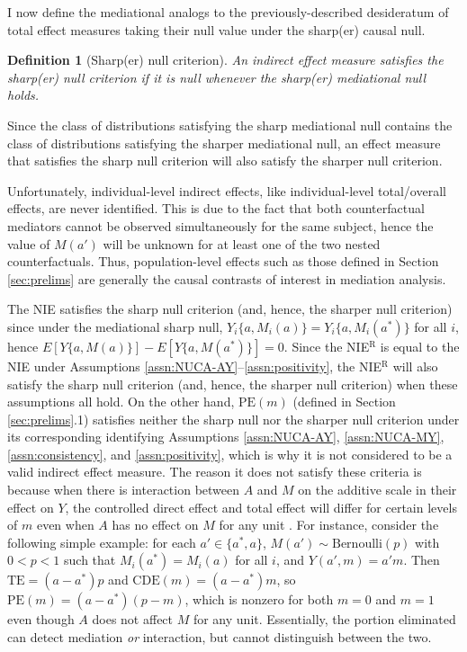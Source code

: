 \documentclass[12pt]{article}
\newtheorem{definition}{Definition}
\begin{document}

I now define the mediational analogs to the previously-described desideratum of total effect measures taking their null value under the sharp(er) causal null.
\begin{definition}[Sharp(er) null criterion]
    An indirect effect measure satisfies the \emph{sharp(er) null criterion} if it is null whenever the sharp(er) mediational null holds.
\end{definition}
Since the class of distributions satisfying the sharp mediational null contains the class of distributions satisfying the sharper mediational null, an effect measure that satisfies the sharp null criterion will also satisfy the sharper null criterion.

Unfortunately, individual-level indirect effects, like individual-level total/overall effects, are never identified. This is due to the fact that both counterfactual mediators cannot be observed simultaneously for the same subject, hence the value of $M(a')$ will be unknown for at least one of the two nested counterfactuals. Thus, population-level effects such as those defined in Section \ref{sec:prelims} are generally the causal contrasts of interest in mediation analysis. 

The NIE satisfies the sharp null criterion (and, hence, the sharper null criterion) since under the mediational sharp null, $Y_i\{a, M_i(a)\} = Y_i\{a, M_i(a^*)\}$ for all $i$, hence $E[Y\{a, M(a)\}] - E[Y\{a, M(a^*)\}]=0$. Since the NIE$^\text{R}$ is equal to the NIE under Assumptions \ref{assn:NUCA-AY}--\ref{assn:positivity}, the NIE$^\text{R}$ will also satisfy the sharp null criterion (and, hence, the sharper null criterion) when these assumptions all hold. On the other hand, $\text{PE}(m)$ (defined in Section \ref{sec:prelims}.1) satisfies neither the sharp null nor the sharper null criterion under its corresponding identifying Assumptions \ref{assn:NUCA-AY}, \ref{assn:NUCA-MY}, \ref{assn:consistency}, and \ref{assn:positivity}, %
which is why it is not considered to be a valid indirect effect measure. The reason it does not satisfy these criteria is because when there is interaction between $A$ and $M$ on the additive scale in their effect on $Y$, the controlled direct effect and total effect will differ for certain levels of $m$ even when $A$ has no effect on $M$ for any unit \citep{vanderweele2009mediation}. For instance, consider the following simple example: for each $a'\in\{a^*,a\}$, $M(a')\sim \mathrm{Bernoulli}(p)$ with $0<p<1$ such that $M_i(a^*)=M_i(a)$ for all $i$, and $Y(a',m)=a'm$. Then $\text{TE}=(a-a^*)p$ and $\text{CDE}(m)=(a-a^*)m$, so $\text{PE}(m)=(a-a^*)(p-m)$, which is nonzero for both $m=0$ and $m=1$ even though $A$ does not affect $M$ for any unit. Essentially, the portion eliminated %
can detect mediation \emph{or} interaction, but cannot distinguish between the two.
\end{document}
